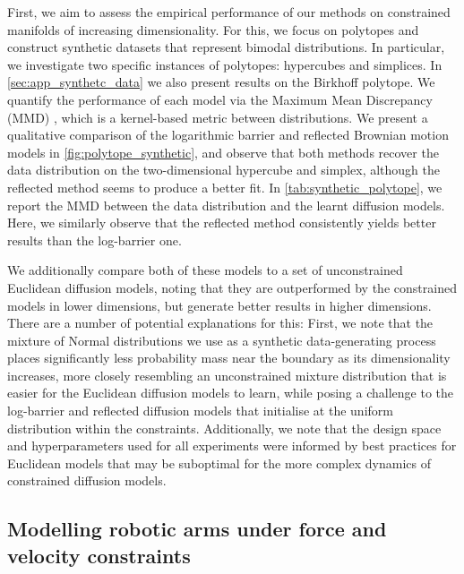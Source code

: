 First, we aim to assess the empirical performance of our methods on constrained manifolds of increasing dimensionality.
For this, we focus on polytopes and construct synthetic datasets that represent bimodal distributions.
In particular, we investigate two specific instances of polytopes: hypercubes and simplices.
In \cref{sec:app_synthetc_data} we also present results on the Birkhoff polytope.
We quantify the performance of each model via the Maximum Mean Discrepancy (\textsc{MMD}) \parencite{gretton2012kernel}, which is a kernel-based metric between distributions.
We present a qualitative comparison of the logarithmic barrier and reflected Brownian motion models in \cref{fig:polytope_synthetic}, and observe that both methods recover the data distribution on the two-dimensional hypercube and simplex, although the reflected method seems to produce a better fit.
In \cref{tab:synthetic_polytope}, we report the \textsc{MMD} between the data distribution and the learnt diffusion models.
Here, we similarly observe that the reflected method consistently yields better results than the log-barrier one.

We additionally compare both of these models to a set of unconstrained Euclidean diffusion models, noting that they are outperformed by the constrained models in lower dimensions, but generate better results in higher dimensions.
There are a number of potential explanations for this: First, we note that the mixture of Normal distributions we use as a synthetic data-generating process places significantly less probability mass near the boundary as its dimensionality increases, more closely resembling an unconstrained mixture distribution that is easier for the Euclidean diffusion models to learn, while posing a challenge to the log-barrier and reflected diffusion models that initialise at the uniform distribution within the constraints.
Additionally, we note that the design space and hyperparameters used for all experiments were informed by best practices for Euclidean models that may be suboptimal for the more complex dynamics of constrained diffusion models.

\subsection{Modelling robotic arms under force and velocity constraints}
\label{subsec:psd_matrices}

